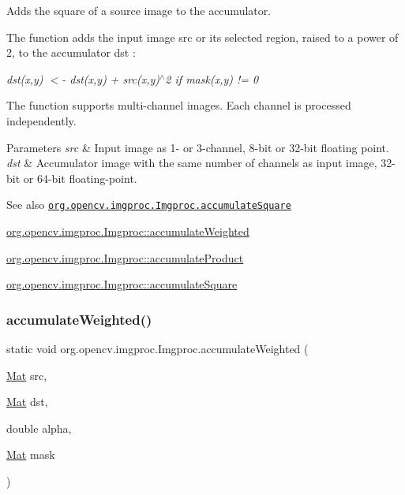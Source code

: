 Adds the square of a source image to the accumulator.

The function adds the input image {\ttfamily src} or its selected region, raised to a power of 2, to the accumulator {\ttfamily dst} \+:

{\itshape dst(x,y) $<$-\/ dst(x,y) + src(x,y)$^\wedge$2 if mask(x,y) != 0}

The function supports multi-\/channel images. Each channel is processed independently.


\begin{DoxyParams}{Parameters}
{\em src} & Input image as 1-\/ or 3-\/channel, 8-\/bit or 32-\/bit floating point. \\
\hline
{\em dst} & Accumulator image with the same number of channels as input image, 32-\/bit or 64-\/bit floating-\/point.\\
\hline
\end{DoxyParams}
\begin{DoxySeeAlso}{See also}
\href{http://docs.opencv.org/modules/imgproc/doc/motion_analysis_and_object_tracking.html#accumulatesquare}{\tt org.\+opencv.\+imgproc.\+Imgproc.\+accumulate\+Square} 

\mbox{\hyperlink{classorg_1_1opencv_1_1imgproc_1_1_imgproc_a67077201750b8f44b2a8ce7483f58883}{org.\+opencv.\+imgproc.\+Imgproc\+::accumulate\+Weighted}} 

\mbox{\hyperlink{classorg_1_1opencv_1_1imgproc_1_1_imgproc_a1be426770d204691d4f181c5ed663f7a}{org.\+opencv.\+imgproc.\+Imgproc\+::accumulate\+Product}} 

\mbox{\hyperlink{classorg_1_1opencv_1_1imgproc_1_1_imgproc_a5de5a552dbd44bbc411de004bc11337b}{org.\+opencv.\+imgproc.\+Imgproc\+::accumulate\+Square}} 
\end{DoxySeeAlso}
\mbox{\label{classorg_1_1opencv_1_1imgproc_1_1_imgproc_a67077201750b8f44b2a8ce7483f58883}} 
\subsubsection{\texorpdfstring{accumulate\+Weighted()}{accumulateWeighted()}\hspace{0.1cm}{\footnotesize\ttfamily [1/2]}}
{\footnotesize\ttfamily static void org.\+opencv.\+imgproc.\+Imgproc.\+accumulate\+Weighted (\begin{DoxyParamCaption}\item[{\mbox{\hyperlink{classorg_1_1opencv_1_1core_1_1_mat}{Mat}}}]{src,  }\item[{\mbox{\hyperlink{classorg_1_1opencv_1_1core_1_1_mat}{Mat}}}]{dst,  }\item[{double}]{alpha,  }\item[{\mbox{\hyperlink{classorg_1_1opencv_1_1core_1_1_mat}{Mat}}}]{mask }\end{DoxyParamCaption})\hspace{0.3cm}{\ttfamily [static]}}

